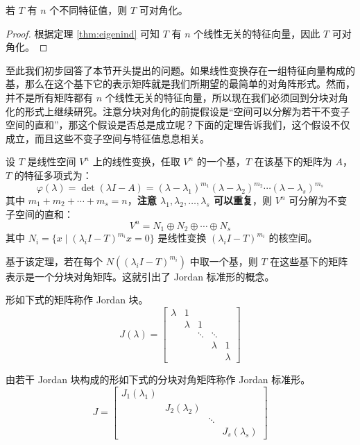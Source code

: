 \begin{corollary}[可对角化的充分条件]
若 $T$ 有 $n$ 个不同特征值，则 $T$ 可对角化。
\end{corollary}
\begin{proof}
根据定理 \ref{thm:eigenind} 可知 $T$ 有 $n$ 个线性无关的特征向量，因此 $T$ 可对角化。
\end{proof}

至此我们初步回答了本节开头提出的问题。如果线性变换存在一组特征向量构成的基，那么在这个基下它的表示矩阵就是我们所期望的最简单的对角阵形式。然而，并不是所有矩阵都有 $n$ 个线性无关的特征向量，所以现在我们必须回到分块对角化的形式上继续研究。注意分块对角化的前提假设是“空间可以分解为若干不变子空间的直和”，那这个假设是否总是成立呢？下面的定理告诉我们，这个假设不仅成立，而且这些不变子空间与特征值息息相关。

\begin{theorem}[基于不变特征子空间的直和分解]
\label{thm:directsum}
设 $T$ 是线性空间 $V^n$ 上的线性变换，任取 $V^n$ 的一个基，$T$ 在该基下的矩阵为 $A$，$T$ 的特征多项式为：
\[
\varphi(\lambda)=\det(\lambda I-A)=(\lambda-\lambda_1)^{m_1}(\lambda-\lambda_2)^{m_2}\cdots(\lambda-\lambda_s)^{m_s}
\]
其中 $m_1+m_2+\cdots+m_s=n$，\textbf{注意 $\lambda_1,\lambda_2,\ldots,\lambda_s$ 可以重复}，则 $V^n$ 可分解为不变子空间的直和：
\[
V^n=N_1\oplus N_2\oplus\cdots\oplus N_s
\]
其中 $N_i=\{x\mid (\lambda_i I-T)^{m_i}x=0\}$ 是线性变换 $(\lambda_iI-T)^{m_i}$ 的核空间。
\end{theorem}

基于该定理，若在每个 $N((\lambda_i I-T)^{m_i})$ 中取一个基，则 $T$ 在这些基下的矩阵表示是一个分块对角矩阵。这就引出了 Jordan 标准形的概念。

\begin{definition}[Jordan 块]
形如下式的矩阵称作 Jordan 块。
\[
    J(\lambda)=\begin{bmatrix}
    \lambda&1&&&\\
    &\lambda&1&&\\
    &&\ddots&\ddots&\\
    &&&\lambda&1\\
    &&&&\lambda
    \end{bmatrix}
\]
\end{definition}

\begin{definition}
由若干 Jordan 块构成的形如下式的分块对角矩阵称作 Jordan 标准形。
\[
    J=\begin{bmatrix}
    J_1(\lambda_1)&&&\\&J_2(\lambda_2)&&\\&&\ddots&\\&&&J_s(\lambda_s)
    \end{bmatrix}
\]
\end{definition}


